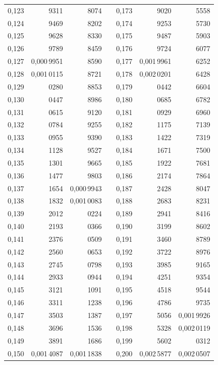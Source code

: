 \begin{tabular}{|r|r|r|@{}p{9pt}@{}|r|r|r|}
0,123 & 9311 & 8074 &  & 0,173 & 9020 & 5558 \\
0,124 & 9469 & 8202 &  & 0,174 & 9253 & 5730 \\
0,125 & 9628 & 8330 &  & 0,175 & 9487 & 5903 \\[3pt]
0,126 & 9789 & 8459 &  & 0,176 & 9724 & 6077 \\
0,127 & 0,000\,9951 & 8590 &  & 0,177 & 0,001\,9961 & 6252 \\
0,128 & 0,001\,0115 & 8721 &  & 0,178 & 0,002\,0201 & 6428 \\
0,129 & 0280 & 8853 &  & 0,179 & 0442 & 6604 \\
0,130 & 0447 & 8986 &  & 0,180 & 0685 & 6782 \\[3pt]
0,131 & 0615 & 9120 &  & 0,181 & 0929 & 6960 \\
0,132 & 0784 & 9255 &  & 0,182 & 1175 & 7139 \\
0,133 & 0955 & 9390 &  & 0,183 & 1422 & 7319 \\
0,134 & 1128 & 9527 &  & 0,184 & 1671 & 7500 \\
0,135 & 1301 & 9665 &  & 0,185 & 1922 & 7681 \\[3pt]
0,136 & 1477 & 9803 &  & 0,186 & 2174 & 7864 \\
0,137 & 1654 & 0,000\,9943 &  & 0,187 & 2428 & 8047 \\
0,138 & 1832 & 0,001\,0083 &  & 0,188 & 2683 & 8231 \\
0,139 & 2012 & 0224 &  & 0,189 & 2941 & 8416 \\
0,140 & 2193 & 0366 &  & 0,190 & 3199 & 8602 \\[3pt]
0,141 & 2376 & 0509 &  & 0,191 & 3460 & 8789 \\
0,142 & 2560 & 0653 &  & 0,192 & 3722 & 8976 \\
0,143 & 2745 & 0798 &  & 0,193 & 3985 & 9165 \\
0,144 & 2933 & 0944 &  & 0,194 & 4251 & 9354 \\
0,145 & 3121 & 1091 &  & 0,195 & 4518 & 9544 \\[3pt]
0,146 & 3311 & 1238 &  & 0,196 & 4786 & 9735 \\
0,147 & 3503 & 1387 &  & 0,197 & 5056 & 0,001\,9926 \\
0,148 & 3696 & 1536 &  & 0,198 & 5328 & 0,002\,0119 \\
0,149 & 3891 & 1686 &  & 0,199 & 5602 & 0312 \\
0,150 & 0,001\,4087 & 0,001\,1838 &  & 0,200 & 0,002\,5877 & 0,002\,0507 \\
\hline
\end{tabular}\par
